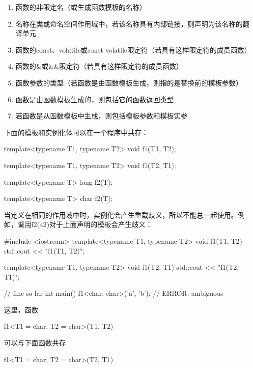 \begin{enumerate}
\item 
函数的非限定名（或生成函数模板的名称）

\item 
名称在类或命名空间作用域中，若该名称具有内部链接，则声明为该名称的翻译单元

\item 
函数的const、volatile或const volatile限定符（若具有这样限定符的成员函数）

\item 
函数的\&或\&\&限定符（若具有这样限定符的成员函数）

\item 
函数参数的类型（若函数是由函数模板生成，则指的是替换前的模板参数）

\item 
函数是由函数模板生成的，则包括它的函数返回类型

\item 
若函数是从函数模板中生成，则包括模板参数和模板实参
\end{enumerate}

下面的模板和实例化体可以在一个程序中共存：

\begin{cpp}
template<typename T1, typename T2>
void f1(T1, T2);

template<typename T1, typename T2>
void f1(T2, T1);

template<typename T>
long f2(T);

template<typename T>
char f2(T);
\end{cpp}

当定义在相同的作用域中时，实例化会产生重载歧义，所以不能总一起使用。例如，调用f2(42)对于上面声明的模板会产生歧义：

\begin{cpp}
#include <iostream>
template<typename T1, typename T2>
void f1(T1, T2) {
	std::cout << "f1(T1, T2)\n";
}

template<typename T1, typename T2>
void f1(T2, T1) {
	std::cout << "f1(T2, T1)\n";
}

// fine so far
int main() {
	f1<char, char>('a', 'b'); // ERROR: ambiguous
}
\end{cpp}

这里，函数

\begin{cpp}
f1<T1 = char, T2 = char>(T1, T2)
\end{cpp}

可以与下面函数共存

\begin{cpp}
f1<T1 = char, T2 = char>(T2, T1)
\end{cpp}

